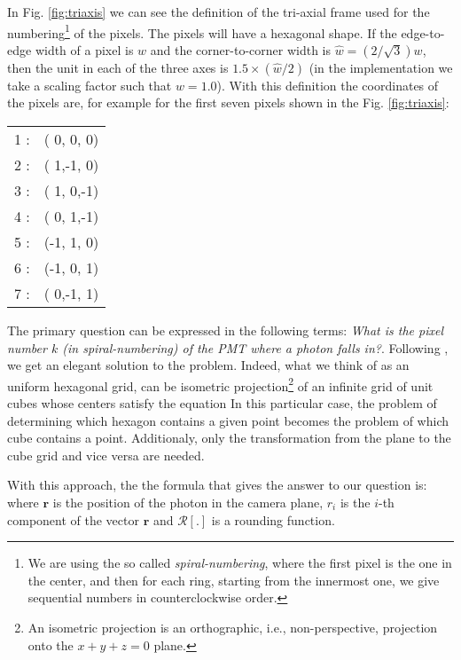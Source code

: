 In Fig. \ref{fig:triaxis} we can see the definition of the tri-axial
frame used for the numbering\footnote{We are using the so called
  \emph{spiral-numbering}, where the first pixel is the one in the
  center, and then for each ring, starting from the innermost one, we
  give sequential numbers in counterclockwise order.} of the pixels.
The pixels will have a hexagonal shape. If the edge-to-edge width of a
pixel is $w$ and the corner-to-corner width is $\hat{w}=(2/\sqrt{3})
w$, then the unit in each of the three axes is $1.5\times (\hat{w}/2)$
(in the implementation we take a scaling factor such that $w=1.0$).
With this definition the coordinates of the pixels are, for example
for the first seven pixels shown in the Fig. \ref{fig:triaxis}:
%
\begin{center}
  \begin{tabular}{rc}
    1 :& ( 0, 0, 0) \\
    2 :& ( 1,-1, 0) \\
    3 :& ( 1, 0,-1) \\
    4 :& ( 0, 1,-1) \\
    5 :& (-1, 1, 0) \\
    6 :& (-1, 0, 1) \\
    7 :& ( 0,-1, 1) \\
  \end{tabular}
\end{center}

The primary question can be expressed in the following terms:
\emph{What is the pixel number $k$ (in spiral-numbering) of the PMT
  where a photon falls in?}.  Following \cite{Fu:hexgrid}, we get an
elegant solution to the problem. Indeed, what we think of as an
uniform hexagonal grid, can be isometric projection\footnote{An
  isometric projection is an orthographic, i.e., non-perspective,
  projection onto the $x+y+z=0$ plane.} of an infinite grid of unit
cubes whose centers satisfy the equation
%
\planeeq
%
In this particular case, the problem of determining which hexagon
contains a given point becomes the problem of which cube contains a
point.  Additionaly, only the transformation from the plane to the
cube grid and vice versa are needed.

With this approach, the the formula that gives the answer to our
question is:
%
\hexgrideq
%
where $\mathbf{r}$ is the position of the photon in the camera plane,
$r_i$ is the $i$-th component of the vector $\mathbf{r}$ and
$\mathcal{R}[\mathord{.}]$ is a rounding function.

\axesfigs

